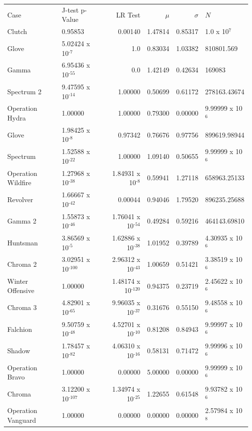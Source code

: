 \documentclass[12pt, letterpaper]{paper}
\begin{document}
\begin{center}
\begin{tabular}{llrrrl}
Case & J-test p-Value & LR Test & $\mu$ & $\sigma$ & $N$\\
Clutch & 0.95853 & 0.00140 & 1.47814 & 0.85317 & 1.0 x 10$^{\text{7}}$\\
Glove & 5.02424 x 10$^{\text{-7}}$ & 1.0 & 0.83034 & 1.03382 & 810801.569\\
Gamma & 6.95436 x 10$^{\text{-55}}$ & 0.0 & 1.42149 & 0.42634 & 169083\\
Spectrum 2 & 9.47595 x 10$^{\text{-14}}$ & 1.00000 & 0.50699 & 0.61172 & 278163.43674\\
Operation Hydra & 1.00000 & 1.00000 & 0.79300 & 0.00000 & 9.99999 x 10$^{\text{6}}$\\
Glove & 1.98425 x 10$^{\text{-8}}$ & 0.97342 & 0.76676 & 0.97756 & 899619.98944\\
Spectrum & 1.52588 x 10$^{\text{-22}}$ & 1.00000 & 1.09140 & 0.50655 & 9.99999 x 10$^{\text{6}}$\\
Operation Wildfire & 1.27968 x 10$^{\text{-38}}$ & 1.84931 x 10$^{\text{-8}}$ & 0.59941 & 1.27118 & 658963.25133\\
Revolver & 1.66667 x 10$^{\text{-42}}$ & 0.00044 & 0.94046 & 1.79520 & 896235.25688\\
Gamma 2 & 1.55873 x 10$^{\text{-46}}$ & 1.76041 x 10$^{\text{-54}}$ & 0.49284 & 0.59216 & 464143.69810\\
Huntsman & 3.86569 x 10$^{\text{-5}}$ & 1.62886 x 10$^{\text{-38}}$ & 1.01952 & 0.39789 & 4.30935 x 10$^{\text{6}}$\\
Chroma 2 & 3.02951 x 10$^{\text{-100}}$ & 2.96312 x 10$^{\text{-43}}$ & 1.00659 & 0.51421 & 3.38519 x 10$^{\text{6}}$\\
Winter Offensive & 1.00000 & 1.48174 x 10$^{\text{-120}}$ & 0.94375 & 0.23719 & 2.45622 x 10$^{\text{6}}$\\
Chroma 3 & 4.82901 x 10$^{\text{-65}}$ & 9.96035 x 10$^{\text{-37}}$ & 0.31676 & 0.55150 & 9.48558 x 10$^{\text{6}}$\\
Falchion & 9.50759 x 10$^{\text{-48}}$ & 4.52701 x 10$^{\text{-10}}$ & 0.81208 & 0.84943 & 9.99997 x 10$^{\text{6}}$\\
Shadow & 1.78457 x 10$^{\text{-82}}$ & 4.06310 x 10$^{\text{-16}}$ & 0.58131 & 0.71472 & 9.99996 x 10$^{\text{6}}$\\
Operation Bravo & 1.00000 & 0.00000 & 5.00000 & 0.00000 & 9.99999 x 10$^{\text{6}}$\\
Chroma & 3.12200 x 10$^{\text{-107}}$ & 1.34974 x 10$^{\text{-25}}$ & 1.22655 & 0.61548 & 9.93782 x 10$^{\text{6}}$\\
Operation Vanguard & 1.00000 & 0.00000 & 0.00000 & 0.00000 & 2.57984 x 10$^{\text{8}}$\\
\end{tabular}
\end{center}
\end{document}
